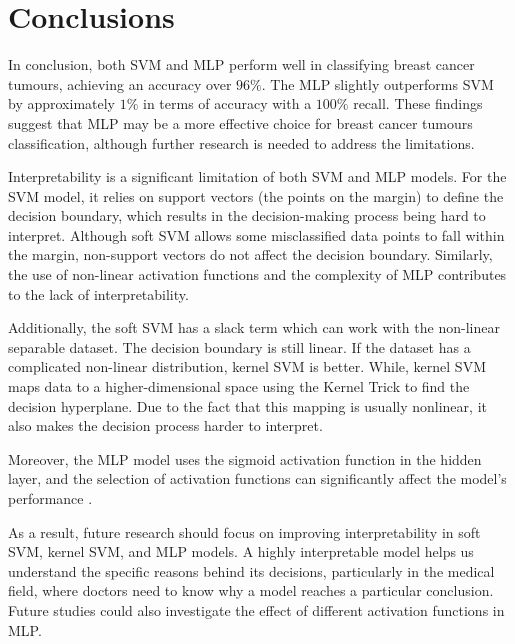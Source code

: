 \section{Conclusions}

In conclusion, both SVM and MLP perform well in classifying breast cancer tumours, achieving an accuracy over \(96\%\). The MLP slightly outperforms SVM by approximately \(1\%\) in terms of accuracy with a \(100\%\) recall. These findings suggest that MLP may be a more effective choice for breast cancer tumours classification, although further research is needed to address the limitations. 

Interpretability is a significant limitation of both SVM and MLP models. For the SVM model, it relies on support vectors (the points on the margin) to define the decision boundary, which results in the decision-making process being hard to interpret. Although soft SVM allows some misclassified data points to fall within the margin, non-support vectors do not affect the decision boundary. Similarly, the use of non-linear activation functions and the complexity of MLP contributes to the lack of interpretability.

Additionally, the soft SVM has a slack term which can work with the non-linear separable dataset. The decision boundary is still linear. If the dataset has a complicated non-linear distribution, kernel SVM \cite{Rao2022efficient} is better. While, kernel SVM maps data to a higher-dimensional space using the Kernel Trick to find the decision hyperplane. Due to the fact that this mapping is usually nonlinear, it also makes the decision process harder to interpret. 

Moreover, the MLP model uses the sigmoid activation function in the hidden layer, and the selection of activation functions can significantly affect the model's performance \cite{DUBEY202292}.

As a result, future research should focus on improving interpretability in soft SVM, kernel SVM, and MLP models. A highly interpretable model helps us understand the specific reasons behind its decisions, particularly in the medical field, where doctors need to know why a model reaches a particular conclusion. Future studies could also investigate the effect of different activation functions in MLP. 